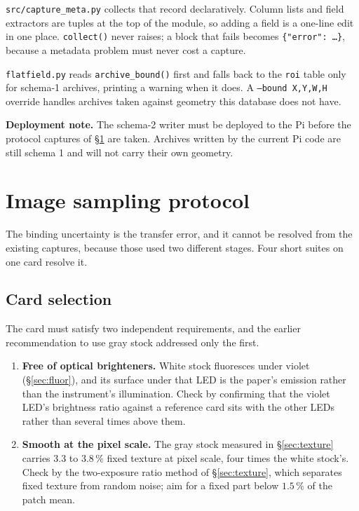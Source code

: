 \documentclass[11pt, a4paper]{article}
\newcommand{\code}[1]{\texttt{#1}}
\newcommand{\pct}{\,\%}
\begin{document}
\code{src/capture\_meta.py} collects that record declaratively.
Column lists and field extractors are tuples at the top of the module,
so adding a field is a one-line edit in one place.
\code{collect()} never raises;
a block that fails becomes \code{\{"error": \ldots\}},
because a metadata problem must never cost a capture.

\code{flatfield.py} reads \code{archive\_bound()} first
and falls back to the \code{roi} table only for schema-1 archives,
printing a warning when it does.
A \code{--bound X,Y,W,H} override handles archives
taken against geometry this database does not have.

\medskip
\noindent
\textbf{Deployment note.}
The schema-2 writer must be deployed to the Pi
before the protocol captures of \S\ref{sec:protocol} are taken.
Archives written by the current Pi code are still schema 1
and will not carry their own geometry.

\section{Image sampling protocol}
\label{sec:protocol}

The binding uncertainty is the transfer error,
and it cannot be resolved from the existing captures,
because those used two different stages.
Four short suites on one card resolve it.

\subsection{Card selection}

The card must satisfy two independent requirements,
and the earlier recommendation to use gray stock addressed only the first.

\begin{enumerate}[nosep]
  \item \textbf{Free of optical brighteners.}
        White stock fluoresces under violet (\S\ref{sec:fluor}),
        and its surface under that LED is the paper's emission
        rather than the instrument's illumination.
        Check by confirming that the violet LED's brightness ratio
        against a reference card
        sits with the other LEDs rather than several times above them.
  \item \textbf{Smooth at the pixel scale.}
        The gray stock measured in \S\ref{sec:texture}
        carries $3.3$ to $3.8\pct$ fixed texture at pixel scale,
        four times the white stock's.
        Check by the two-exposure ratio method of \S\ref{sec:texture},
        which separates fixed texture from random noise;
        aim for a fixed part below $1.5\pct$ of the patch mean.
\end{enumerate}
\end{document}
